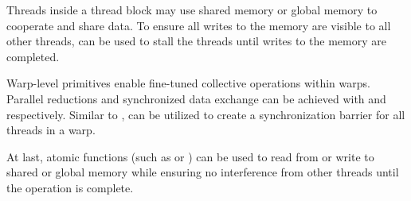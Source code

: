 Threads inside a thread block may use shared memory or global memory to cooperate and share data. To ensure all writes to the memory are visible to all other threads,  can be used to stall the threads until writes to the memory are completed.

Warp-level primitives enable fine-tuned collective operations within warps. Parallel reductions and synchronized data exchange can be achieved with  and  respectively. Similar to ,  can be utilized to create a synchronization barrier for all threads in a warp.

At last, atomic functions (such as  or ) can be used to read from or write to shared or global memory while ensuring no interference from other threads until the operation is complete.